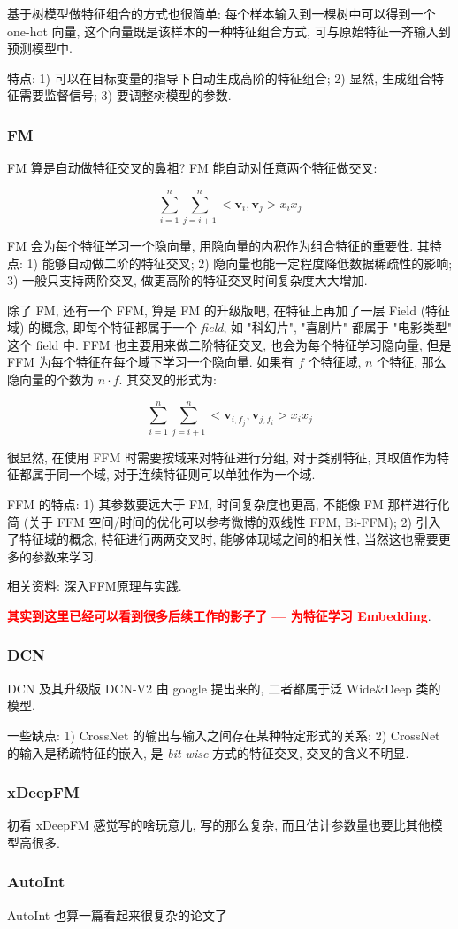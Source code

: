 基于树模型做特征组合的方式也很简单: 每个样本输入到一棵树中可以得到一个 one-hot 向量, 这个向量既是该样本的一种特征组合方式, 可与原始特征一齐输入到预测模型中. 

特点: 1) 可以在目标变量的指导下自动生成高阶的特征组合; 2) 显然, 生成组合特征需要监督信号; 3) 要调整树模型的参数.

\subsubsection{FM}

FM\cite{steffen_fm_2011} 算是自动做特征交叉的鼻祖? FM 能自动对任意两个特征做交叉:

$$
\sum_{i=1}^n \sum_{j=i+1}^n <\bm{v}_i, \bm{v}_j> x_i x_j
$$

FM 会为每个特征学习一个隐向量, 用隐向量的内积作为组合特征的重要性. 其特点: 1) 能够自动做二阶的特征交叉; 2) 隐向量也能一定程度降低数据稀疏性的影响; 3) 一般只支持两阶交叉, 做更高阶的特征交叉时间复杂度大大增加.

除了 FM, 还有一个 FFM\cite{juan_ffm_2016}, 算是 FM 的升级版吧, 在特征上再加了一层 Field (特征域) 的概念, 即每个特征都属于一个 \textit{field}, 如 "科幻片", "喜剧片" 都属于 "电影类型" 这个 field 中. FFM 也主要用来做二阶特征交叉, 也会为每个特征学习隐向量, 但是 FFM 为每个特征在每个域下学习一个隐向量. 如果有 $f$ 个特征域, $n$ 个特征, 那么隐向量的个数为 $n \cdot f$. 其交叉的形式为:

$$
\sum_{i=1}^n \sum_{j=i+1}^n <\bm{v}_{i, f_j}, \bm{v}_{j, f_i}> x_i x_j
$$

很显然, 在使用 FFM 时需要按域来对特征进行分组, 对于类别特征, 其取值作为特征都属于同一个域, 对于连续特征则可以单独作为一个域. 

FFM 的特点: 1) 其参数要远大于 FM, 时间复杂度也更高, 不能像 FM 那样进行化简 (关于 FFM 空间/时间的优化可以参考微博的双线性 FFM, Bi-FFM); 2) 引入了特征域的概念, 特征进行两两交叉时, 能够体现域之间的相关性, 当然这也需要更多的参数来学习.


相关资料: \href{https://tech.meituan.com/2016/03/03/deep-understanding-of-ffm-principles-and-practices.html}{深入FFM原理与实践}. 

\textcolor{red}{\textbf{其实到这里已经可以看到很多后续工作的影子了 --- 为特征学习 Embedding}}. 

\subsubsection{DCN}

DCN\cite{wang_dcn_2017} 及其升级版 DCN-V2\cite{wang_dcnv2_2021} 由 google 提出来的, 二者都属于泛 Wide\&Deep 类的模型. 

一些缺点: 1) CrossNet 的输出与输入之间存在某种特定形式的关系; 2) CrossNet 的输入是稀疏特征的嵌入, 是 \textit{bit-wise} 方式的特征交叉, 交叉的含义不明显.

\subsubsection{xDeepFM}

初看 xDeepFM\cite{jianxun_xdeepfm_2018} 感觉写的啥玩意儿, 写的那么复杂, 而且估计参数量也要比其他模型高很多. 

\subsubsection{AutoInt}
AutoInt\cite{song_autoint_2019} 也算一篇看起来很复杂的论文了